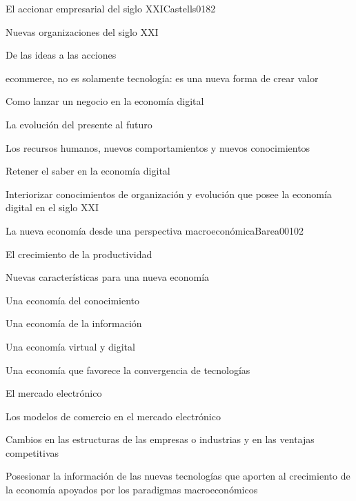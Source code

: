 \begin{syllabus}
\begin{unit}{El accionar empresarial del siglo XXI}{Castells01}{8}{2}
   \begin{topics}
      \item Nuevas organizaciones del siglo XXI
	\item De las ideas a las acciones
	\item ecommerce, no es solamente tecnología: es una nueva forma de crear valor
	\item Como lanzar un negocio en la economía digital
	\item La evolución del presente al futuro
	\item Los recursos humanos, nuevos comportamientos y nuevos conocimientos
	\item Retener el saber en la economía digital
   \end{topics}

   \begin{unitgoals}
      \item Interiorizar conocimientos de organización y evolución que posee la economía digital en el siglo XXI
   \end{unitgoals}
\end{unit}

\begin{unit}{La nueva economía desde una perspectiva macroeconómica}{Barea00}{10}{2}
   \begin{topics}
      \item El crecimiento de la productividad
	\item Nuevas características para una nueva economía
	\item Una economía del conocimiento
	\item Una economía de la información
	\item Una economía virtual y digital
	\item Una economía que favorece la convergencia de tecnologías
	\item El mercado electrónico
	\item Los modelos de comercio en el mercado electrónico
	\item Cambios en las estructuras de las empresas o industrias y en las ventajas competitivas
  \end{topics}

   \begin{unitgoals}
      \item Posesionar la información de las nuevas tecnologías que aporten al crecimiento de la economía apoyados por los paradigmas macroeconómicos
   \end{unitgoals}
\end{unit}


\end{syllabus}
